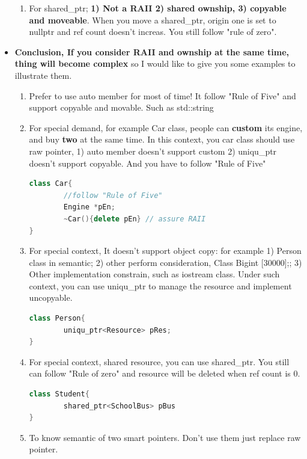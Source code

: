 \documentclass[a4paper,11pt,twoside]{book}
\begin{document}
\begin{itemize}
\begin{enumerate}
		\item For shared\_ptr; \textbf{1) Not a RAII 2) shared ownship, 3) copyable and moveable}. When you move a shared\_ptr, origin one is set to nullptr and ref count doesn't increas.  You still follow "rule of zero".
		
	\end{enumerate}
	
	\item \textbf{ Conclusion, If you consider RAII and ownship at the same time, thing will become complex}  so I would like to give you some examples to illustrate them.
	
	\begin{enumerate}
		\item Prefer to use auto member for most of time! It follow "Rule of Five" and support copyable and movable. Such as std::string
		
		\item  For special demand, for example Car class,  people can \textbf{custom} its engine, and buy \textbf{two} at the same time. In this context, you car class should use raw pointer, 1) auto member doesn't support custom 2) uniqu\_ptr doesn't support copyable.  And you have to follow "Rule of Five"
\begin{lstlisting}[frame=single, language=c++]
class Car{
		//follow "Rule of Five"
		Engine *pEn;
		~Car(){delete pEn} // assure RAII
}
		\end{lstlisting}
		
		\item For special context, It doesn't support object copy: for example 1) Person class in semantic;  2) other  perform consideration, Class Big{int [30000];};  3) Other implementation constrain, such as iostream class.   Under such context, you can use uniqu\_ptr to manage the resource and implement uncopyable.
\begin{lstlisting}[frame=single, language=c++]
class Person{
		uniqu_ptr<Resource> pRes;
}
		\end{lstlisting}
		
		\item For special context, shared resource, you can use shared\_ptr.  You still can follow "Rule of zero" and resource will be deleted when ref count is 0.
\begin{lstlisting}[frame=single, language=c++]
class Student{
		shared_ptr<SchoolBus> pBus
}
\end{lstlisting}
		
		\item To know semantic of two smart pointers. Don't use them just replace raw pointer.
	\end{enumerate}

\end{itemize}
\end{document}
